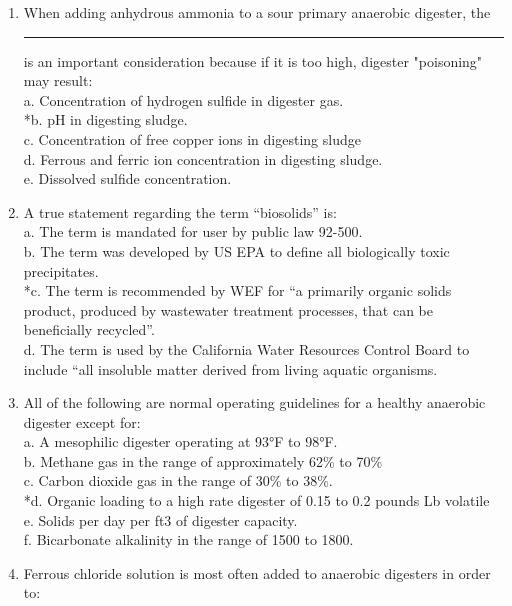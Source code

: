 \documentclass{article}
\begin{document}
\begin{enumerate}
\item  When adding anhydrous ammonia to a sour primary anaerobic digester, the\rule{1.5cm}{0.3cm} is an important consideration because if it is too high, digester "poisoning" may result: \\

a. Concentration of hydrogen sulfide in digester gas. \\
*b. pH in digesting sludge. \\
c. Concentration of free copper ions in digesting sludge \\
d. Ferrous and ferric ion concentration in digesting sludge. \\
e. Dissolved sulfide concentration. \\

\item  A true statement regarding the term “biosolids” is: \\

a. The term is mandated for user by public law 92-500. \\
b. The term was developed by US EPA to define all biologically toxic precipitates. \\
*c. The term is recommended by WEF for “a primarily organic solids product, produced by wastewater treatment processes, that can be beneficially recycled”. \\
d. The term is used by the California Water Resources Control Board to include “all insoluble matter derived from living aquatic organisms. \\

\item  All of the following are normal operating guidelines for a healthy anaerobic digester except for: \\

a. A mesophilic digester operating at 93°F to 98°F. \\
b. Methane gas in the range of approximately 62\% to 70\% \\
c. Carbon dioxide gas in the range of 30\% to 38\%. \\
*d. Organic loading to a high rate digester of 0.15 to 0.2 pounds Lb volatile \\
e. Solids per day per ft3 of digester capacity. \\
f. Bicarbonate alkalinity in the range of 1500 to 1800. \\

\item  Ferrous chloride solution is most often added to anaerobic digesters in order to: \\


\end{enumerate}
\end{document}
